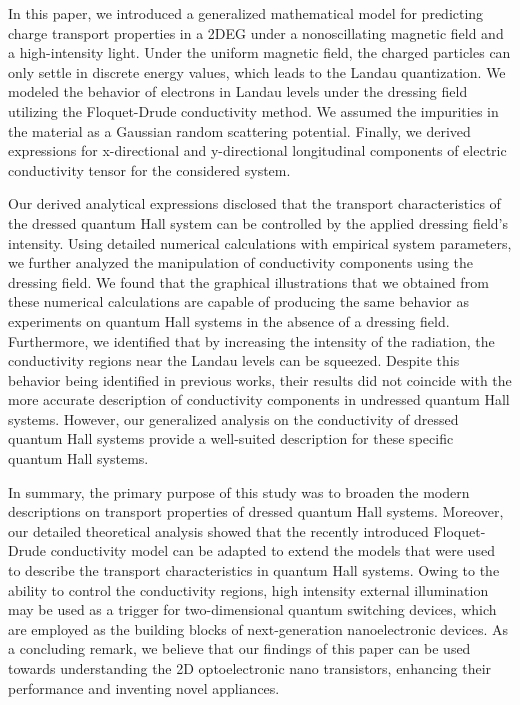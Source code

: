 In this paper, we introduced a generalized mathematical model for predicting  charge transport properties in a 2DEG under a nonoscillating magnetic field and a high-intensity light. Under the uniform magnetic field, the charged particles can only settle in discrete energy values, which leads to the Landau quantization. We modeled the behavior of electrons in Landau levels under the dressing field utilizing the Floquet-Drude conductivity method. We assumed the impurities in the material as a Gaussian random scattering potential. Finally, we derived expressions for x-directional and y-directional longitudinal components of electric conductivity tensor for the considered system.

Our derived analytical expressions disclosed that the transport characteristics of the dressed quantum Hall system can be controlled by the applied dressing field’s intensity. Using detailed numerical calculations with empirical system parameters, we further analyzed the manipulation of conductivity components using the dressing field.
We found that the graphical illustrations that we obtained from these numerical calculations are capable of producing the same behavior as experiments on quantum Hall systems in the absence of a dressing field.
Furthermore, we identified that by increasing the intensity of the radiation, the conductivity regions near the Landau levels can be squeezed. Despite this behavior being identified in previous works, their results did not coincide with the more accurate description of conductivity components in undressed quantum Hall systems. However, our generalized analysis on the conductivity of dressed quantum Hall systems provide a well-suited description for these specific quantum Hall systems.

In summary, the primary purpose of this study was to broaden the modern descriptions on transport properties of dressed quantum Hall systems. Moreover, our detailed theoretical analysis showed that the recently introduced Floquet-Drude conductivity model can be adapted to extend the models that were used to describe the transport characteristics in quantum Hall systems. Owing to the ability to control the conductivity regions, high intensity external illumination may be used as a trigger for two-dimensional quantum switching devices, which are employed as the building blocks of next-generation nanoelectronic devices. As a concluding remark, we believe that our findings of this paper can be used towards understanding the 2D optoelectronic nano transistors, enhancing their performance and inventing novel appliances.
